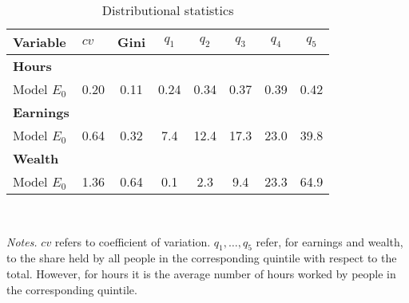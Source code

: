 \begin{table}[!htbp]
\centering
\caption{Distributional statistics}
\begin{tabular}{llcccccc}
\toprule
Variable & $cv$ & Gini & $q_1$ & $q_2$ & $q_3$ & $q_4$ & $q_5$ \\
\midrule
\textbf{Hours} &   &  &   &  &  &  &  \\
Model $E_0$ & 0.20 & 0.11 & 0.24 & 0.34 & 0.37 & 0.39 & 0.42 \\
\addlinespace
\textbf{Earnings} &   &  &   &  &  &  &  \\
Model $E_0$ & 0.64 & 0.32 & 7.4 & 12.4 & 17.3 & 23.0 & 39.8 \\
\addlinespace
\textbf{Wealth} &   &  &   &  &  &  &  \\
Model $E_0$ & 1.36 & 0.64 & 0.1 & 2.3 & 9.4 & 23.3 & 64.9 \\
\bottomrule
\end{tabular}
\\[3ex]
\raggedright\footnotesize{\textit{Notes.} $cv$ refers to coefficient of variation. $q_1, \dots, q_5$ refer, for earnings and wealth, to the share held by all people in the corresponding quintile with respect to the total. However, for hours it is the average number of hours worked by people in the corresponding quintile.}\\
\normalsize
\end{table}
